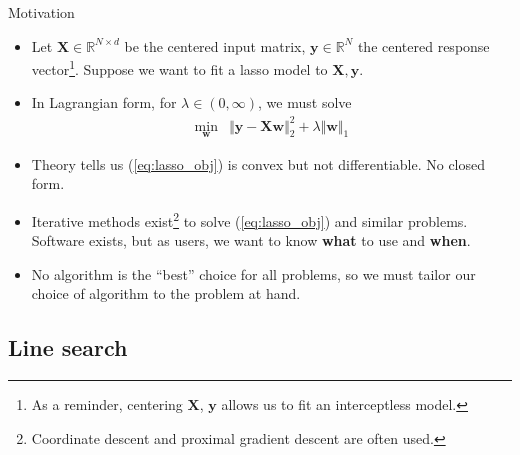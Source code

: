 \documentclass{beamer}
\numberwithin{equation}{section}
\newcommand{\aref}[1]{\alert{\ref{#1}}}
\begin{document}
\begin{frame}{Motivation}
    \begin{itemize}
        \item
        Let $ \mathbf{X} \in \mathbb{R}^{N \times d} $ be the centered input
        matrix, $ \mathbf{y} \in \mathbb{R}^N $ the centered response
        vector\footnote{
            As a reminder, centering $ \mathbf{X} $, $ \mathbf{y} $ allows us
            to fit an interceptless model.
        }.
        Suppose we want to fit a lasso model to $ \mathbf{X}, \mathbf{y} $.

        \item
        In Lagrangian form, for $ \lambda \in (0, \infty) $, we must solve
        \begin{equation} \label{eq:lasso_obj}
            \begin{array}{ll}
                \displaystyle\min_\mathbf{w} &
                \Vert\mathbf{y} - \mathbf{Xw}\Vert_2^2 +
                \lambda\Vert\mathbf{w}\Vert_1
            \end{array}
        \end{equation}

        \item
        Theory tells us (\aref{eq:lasso_obj}) is convex but not
        differentiable. No closed form.

        \item
        Iterative methods exist\footnote{
            Coordinate descent and proximal gradient descent are often used.
        } to solve (\aref{eq:lasso_obj}) and similar
        problems. Software exists, but as users, we want to know \textbf{what}
        to use and \textbf{when}.

        \item
        \alert{
            No algorithm is the ``best'' choice for all problems, so we must
            tailor our choice of algorithm to the problem at hand.
        }
    \end{itemize}
\end{frame}

\subsection{Line search}
\end{document}
